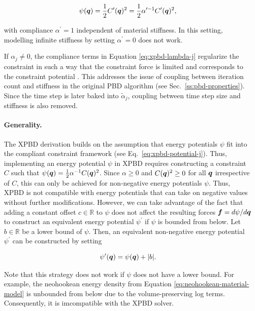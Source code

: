\[
    \psi(\bm{q}) = \frac{1}{2} C^{\prime}(\bm{q})^2 = \frac{1}{2} \alpha^{\prime -1}C^{\prime}(\bm{q})^2,
\]

\noindent with compliance $\alpha^\prime = 1$ independent of material stiffness. In this setting, modelling infinite stiffness by setting 
$\alpha^\prime = 0$ does not work.

If $\alpha_j \neq 0$, the compliance terms in Equation \ref{eq:xpbd-lambda-j} regularize the constraint in such a way that the constraint force is 
limited and corresponds to the constraint potential \cite{macklin2016}. This addresses the issue of coupling between iteration count and stiffness in 
the original PBD algorithm (see Sec.\ \ref{ss:pbd-properties}). Since the time step is later baked into $\tilde{\alpha}_j$, coupling between time step size 
and stiffness is also removed.

\paragraph{Generality.}
The XPBD derivation builds on the assumption that energy potentials $\psi$ fit into the compliant constraint framework (see Eq.\ \ref{eq:xpbd-potential-j}).
Thus, implementing an energy potential $\psi$ in XPBD requires constructing a constraint $C$ such that 
$\psi(\bm{q}) = \frac{1}{2} \alpha^{-1} C(\bm{q})^2$. Since $\alpha \geq 0$ and $C(\bm{q})^2 \geq 0$ for all $\bm{q}$ irrespective of $C$, this 
can only be achieved for non-negative energy potentials 
$\psi$. Thus, XPBD is not compatible with energy potentials that can take on negative values without further modifications. However, we can take 
advantage of the fact that adding a constant offset $c \in \mathbb{R}$ to $\psi$ does not affect the resulting forces $\bm{f} = d\psi / d\bm{q}$ 
to construct an equivalent energy potential $\psi^\prime$ if $\psi$ is bounded from below. Let $b \in \mathbb{R}$ be a lower bound of $\psi$. Then,
an equivalent non-negative energy potential $\psi^\prime$ can be constructed by setting

\begin{equation}\label{eq:xpbd-potential-non-negative}
    \psi^\prime(\bm{q}) = \psi(\bm{q}) + \vert b \vert.
\end{equation}

\noindent Note that this strategy does not work if $\psi$ does not have a lower bound. For example, the neohookean energy density from 
Equation \ref{eq:neohookean-material-model} is unbounded from below due to the volume-preserving log terms. Consequently, it is imcompatible with the XPBD 
solver.


